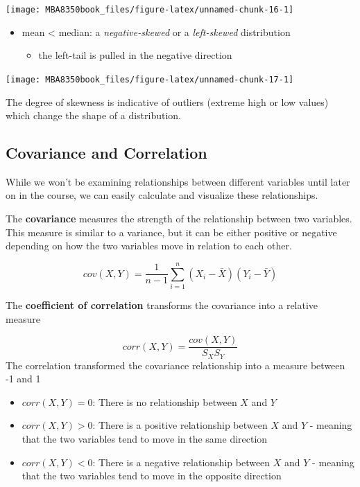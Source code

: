 \documentclass[
]{book}
\providecommand{\tightlist}{%
  \setlength{\itemsep}{0pt}\setlength{\parskip}{0pt}}
\begin{document}
\begin{center}\texttt{[image: MBA8350book\_files/figure-latex/unnamed-chunk-16-1]} \end{center}

\begin{itemize}
\tightlist
\item
  mean \textless{} median: a \emph{negative-skewed} or a \emph{left-skewed} distribution

  \begin{itemize}
  \tightlist
  \item
    the left-tail is pulled in the negative direction
  \end{itemize}
\end{itemize}

\begin{center}\texttt{[image: MBA8350book\_files/figure-latex/unnamed-chunk-17-1]} \end{center}

The degree of skewness is indicative of outliers (extreme high or low values) which change the shape of a distribution.

\hypertarget{covariance-and-correlation}{%
\subsection{Covariance and Correlation}\label{covariance-and-correlation}}

While we won't be examining relationships between different variables until later on in the course, we can easily calculate and visualize these relationships.

The \textbf{covariance} measures the strength of the relationship between two variables. This measure is similar to a variance, but it can be either positive or negative depending on how the two variables move in relation to each other.

\[cov(X,Y)=\frac{1}{n-1}\sum\limits_{i=1}^n(X_i-\bar{X})(Y_i-\bar{Y})\]

The \textbf{coefficient of correlation} transforms the covariance into a relative measure

\[corr(X,Y)=\frac{cov(X,Y)}{S_{X}S_{Y}}\]
The correlation transformed the covariance relationship into a measure between -1 and 1

\begin{itemize}
\item
  \(corr(X,Y)=0\): There is no relationship between \(X\) and \(Y\)
\item
  \(corr(X,Y)>0\): There is a positive relationship between \(X\) and \(Y\) - meaning that the two variables tend to move in the same direction
\item
  \(corr(X,Y)<0\): There is a negative relationship between \(X\) and \(Y\) - meaning that the two variables tend to move in the opposite direction
\end{itemize}
\end{document}

